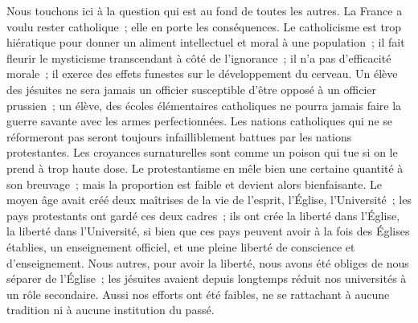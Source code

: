 \documentclass[french,twoside]{book} %
\begin{document}
Nous touchons ici à la question qui est au fond de toutes les autres. La France a voulu rester catholique ; elle en porte les conséquences. Le catholicisme est trop hiératique pour donner un aliment intellectuel et moral à une population ; il fait fleurir le mysticisme transcendant à côté de l’ignorance ; il n’a pas d’efficacité morale ; il exerce des effets funestes sur le développement du cerveau. Un élève des jésuites ne sera jamais un officier susceptible d’être opposé à un officier prussien ; un élève, des écoles élémentaires catholiques ne pourra jamais faire la guerre savante avec les armes perfectionnées. Les nations catholiques qui ne se réformeront pas seront toujours infailliblement battues par les nations protestantes. Les croyances surnaturelles sont comme un poison qui tue si on le prend à trop haute dose. Le protestantisme en mêle bien une certaine quantité à son breuvage ; mais la proportion est faible et devient alors bienfaisante. Le moyen âge avait créé deux maîtrises de la vie de l’esprit, l’Église, l’Université ; les pays protestants ont gardé ces deux cadres ; ils ont crée la liberté dans l’Église, la liberté dans l’Université, si bien que ces pays peuvent avoir à la fois des Églises établies, un enseignement officiel, et une pleine liberté de conscience et d’enseignement. Nous autres, pour avoir la liberté, nous avons été obliges de nous séparer de l’Église ; les jésuites avaient depuis longtemps réduit nos universités à un rôle secondaire. Aussi nos efforts ont été faibles, ne se rattachant à aucune tradition ni à aucune institution du passé.\par
\end{document}
